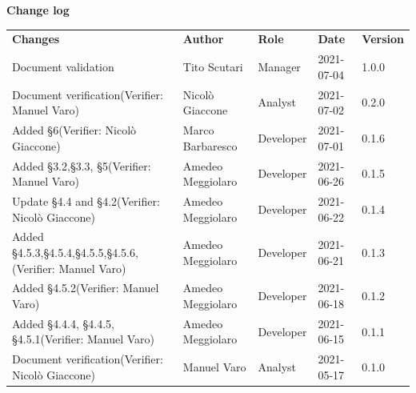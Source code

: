 \documentclass[a4paper]{article}
\begin{document}
\begin{center}
    \textbf{\Large Change log}\\
    \vspace{10px}
    \begin{table}[h!]
        \centering
        \renewcommand{\arraystretch}{1.8}
        \begin{tabular}{p{150px} p{90px} p{80px} p{60px} p{45px}}
            \rowcolor{logo!70} \textbf{Changes}                                           & \textbf{Author}   & \textbf{Role} & \textbf{Date} & \textbf{Version} \\
            Document validation                                                           & Tito Scutari      & Manager       & 2021-07-04    & 1.0.0            \\
            Document verification\newline(Verifier: Manuel Varo)                          & Nicolò Giaccone   & Analyst       & 2021-07-02    & 0.2.0            \\
            Added \S{6}\newline(Verifier: Nicolò Giaccone)                                & Marco Barbaresco  & Developer     & 2021-07-01    & 0.1.6            \\
            Added \S{3.2},\S{3.3}, \S{5}\newline(Verifier: Manuel Varo)                   & Amedeo Meggiolaro & Developer     & 2021-06-26    & 0.1.5            \\
            Update \S{4.4} and \S{4.2}\newline(Verifier: Nicolò Giaccone)                 & Amedeo Meggiolaro & Developer     & 2021-06-22    & 0.1.4            \\
            Added \S{4.5.3},\S{4.5.4},\S{4.5.5},\S{4.5.6},\newline(Verifier: Manuel Varo) & Amedeo Meggiolaro & Developer     & 2021-06-21    & 0.1.3            \\
            Added \S{4.5.2}\newline(Verifier: Manuel Varo)                                & Amedeo Meggiolaro & Developer     & 2021-06-18    & 0.1.2            \\
            Added \S{4.4.4}, \S{4.4.5}, \S{4.5.1}\newline(Verifier: Manuel Varo)          & Amedeo Meggiolaro & Developer     & 2021-06-15    & 0.1.1            \\
            Document verification\newline(Verifier: Nicolò Giaccone)                      & Manuel Varo       & Analyst       & 2021-05-17    & 0.1.0            \\

\end{tabular}
\end{table}
\end{center}
\end{document}
